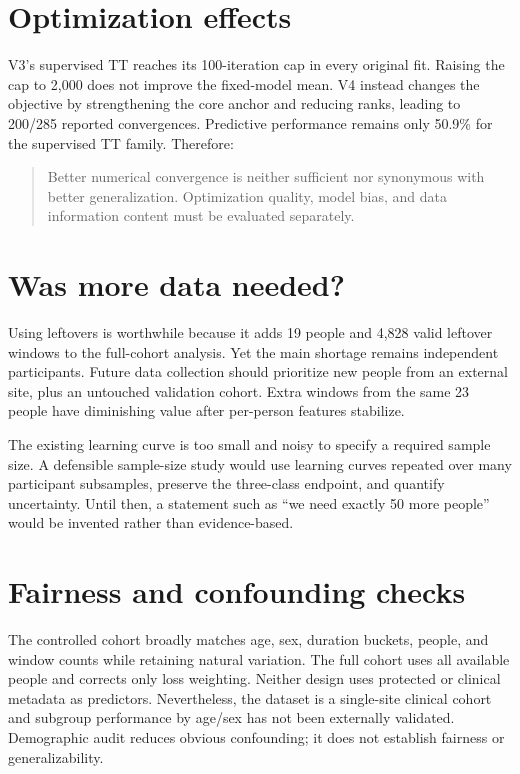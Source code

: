 \section{Optimization effects}

V3's supervised TT reaches its 100-iteration cap in every original fit. Raising
the cap to 2,000 does not improve the fixed-model mean. V4 instead changes the
objective by strengthening the core anchor and reducing ranks, leading to
200/285 reported convergences. Predictive performance remains only 50.9\% for
the supervised TT family. Therefore:

\begin{quote}
Better numerical convergence is neither sufficient nor synonymous with better
generalization. Optimization quality, model bias, and data information content
must be evaluated separately.
\end{quote}

\section{Was more data needed?}

Using leftovers is worthwhile because it adds 19 people and 4,828 valid leftover
windows to the full-cohort analysis. Yet the main shortage remains independent
\FTD{} participants. Future data collection should prioritize new \FTD{} people
from an external site, plus an untouched validation cohort. Extra windows from
the same 23 people have diminishing value after per-person features stabilize.

The existing learning curve is too small and noisy to specify a required sample
size. A defensible sample-size study would use learning curves repeated over
many participant subsamples, preserve the three-class endpoint, and quantify
uncertainty. Until then, a statement such as ``we need exactly 50 more people''
would be invented rather than evidence-based.

\section{Fairness and confounding checks}

The controlled cohort broadly matches age, sex, duration buckets, people, and
window counts while retaining natural variation. The full cohort uses all
available people and corrects only loss weighting. Neither design uses protected
or clinical metadata as predictors. Nevertheless, the dataset is a single-site
clinical cohort and subgroup performance by age/sex has not been externally
validated. Demographic audit reduces obvious confounding; it does not establish
fairness or generalizability.

